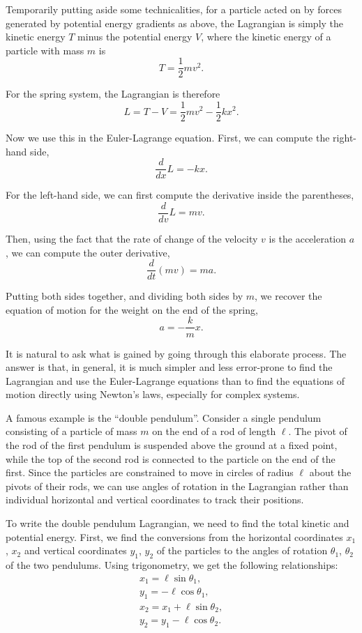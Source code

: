 \documentclass[11pt]{article}
\begin{document}
Temporarily putting aside some technicalities, for a particle acted on by forces generated by potential energy gradients as above, the Lagrangian is simply the kinetic energy $T$ minus the potential energy $V$, where the kinetic energy of a particle with mass $m$ is
$$T=\frac{1}{2}mv^2.$$

For the spring system, the Lagrangian is therefore
$$L=T-V=\frac{1}{2}mv^2-\frac{1}{2}kx^2.$$

Now we use this in the Euler\hyp{}Lagrange equation. First, we can compute the right\hyp{}hand side,
$$\frac{d}{dx}L=-kx.$$

For the left\hyp{}hand side, we can first compute the derivative inside the parentheses,
$$\frac{d}{dv}L=mv.$$

Then, using the fact that the rate of change of the velocity $v$ is the acceleration $a$, we can compute the outer derivative,
$$\frac{d}{dt}\left(mv\right)=ma.$$
\newpage

Putting both sides together, and dividing both sides by $m$, we recover the equation of motion for the weight on the end of the spring,
$$a=-\frac{k}{m}x.$$

It is natural to ask what is gained by going through this elaborate process. The answer is that, in general, it is much simpler and less error\hyp{}prone to find the Lagrangian and use the Euler\hyp{}Lagrange equations than to find the equations of motion directly using Newton's laws, especially for complex systems.
\newline

A famous example is the ``double pendulum''. Consider a single pendulum consisting of a particle of mass $m$ on the end of a rod of length $\ell$. The pivot of the rod of the first pendulum is suspended above the ground at a fixed point, while the top of the second rod is connected to the particle on the end of the first. Since the particles are constrained to move in circles of radius $\ell$ about the pivots of their rods, we can use angles of rotation in the Lagrangian rather than individual horizontal and vertical coordinates to track their positions.
\newline

To write the double pendulum Lagrangian, we need to find the total kinetic and potential energy. First, we find the conversions from the horizontal coordinates $x_1$, $x_2$ and vertical coordinates $y_1$, $y_2$ of the particles to the angles of rotation $\theta_1$, $\theta_2$ of the two pendulums. Using trigonometry, we get the following relationships:
\begin{gather*}
x_1=\ell\sin\theta_1,\\[4pt]
y_1=-\ell\cos\theta_1,\\[4pt]
x_2=x_1+\ell\sin\theta_2,\\[4pt]
y_2=y_1-\ell\cos\theta_2.
\end{gather*}
\newpage
\end{document}
